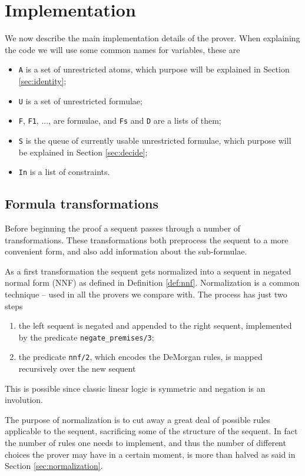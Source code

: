 \chapter{Implementation}
We now describe the main implementation details of the prover.
When explaining the code we will use some common names for variables, these are
\begin{itemize}
	\item \texttt{A} is a set of unrestricted atoms, which purpose will be explained in Section \ref{sec:identity};
	\item \texttt{U} is a set of unrestricted formulae;
	\item \texttt{F}, \texttt{F1}, ..., are formulae, and \texttt{Fs} and \texttt{D} are a lists of them;
	\item \texttt{S} is the queue of currently usable unrestricted formulae, which purpose will be explained in Section \ref{sec:decide};
	\item \texttt{In} is a list of constraints.
\end{itemize}

\section{Formula transformations}
Before beginning the proof a sequent passes through a number of transformations.
These transformations both preprocess the sequent to a more convenient form, and also add information about the sub-formulae.

As a first transformation the sequent gets normalized into a sequent in negated normal form (NNF) as defined in Definition \ref{def:nnf}.
Normalization is a common technique -- used in all the provers we compare with.
The process has just two steps
\begin{enumerate}
	\item the left sequent is negated and appended to the right sequent, implemented by the predicate \texttt{negate\_premises/3};
	\item the predicate \texttt{nnf/2}, which encodes the DeMorgan rules, is mapped recursively over the new sequent
\end{enumerate}
This is possible since classic linear logic is symmetric and negation is an involution.

The purpose of normalization is to cut away a great deal of possible rules applicable to the sequent, sacrificing some of the structure of the sequent.
In fact the number of rules one needs to implement, and thus the number of different choices the prover may have in a certain moment, is more than halved as said in Section \ref{sec:normalization}.


